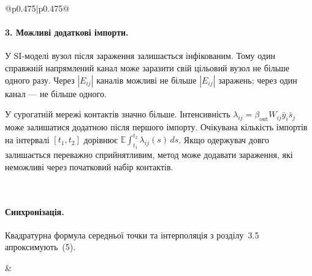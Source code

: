 \documentclass[11pt]{article}
\newcommand{\ibar}{\bar{y}}
\newcommand{\sbar}{\bar{s}}
\begin{document}
\begin{longtable}{@{}p{0.475\textwidth}|p{0.475\textwidth}@{}}
\begin{minipage}[t]{\linewidth}
\paragraph{3. Можливі додаткові імпорти.}
У SI-моделі вузол після зараження залишається інфікованим. Тому один справжній напрямлений канал може заразити свій цільовий вузол не більше одного разу. Через $|E_{ij}|$ каналів можливі не більше $|E_{ij}|$ заражень; через один канал --- не більше одного.
\par У сурогатній мережі контактів значно більше. Інтенсивність $\lambda_{ij}=\beta_{\mathrm{out}}W_{ij}\ibar_i\sbar_j$ може залишатися додатною після першого імпорту. Очікувана кількість імпортів на інтервалі $[t_1,t_2]$ дорівнює $\mathbb{E}\int_{t_1}^{t_2}\lambda_{ij}(s)\,ds$. Якщо одержувач довго залишається переважно сприйнятливим, метод може додавати зараження, які неможливі через початковий набір контактів.
\end{minipage} \\[5mm]
\begin{minipage}[t]{\linewidth}
\paragraph{Синхронізація.}
Квадратурна формула середньої точки та інтерполяція з розділу~3.5 апроксимують~(5).
\end{minipage} &
\begin{minipage}[t]{\linewidth}

\end{minipage}
\end{longtable}
\end{document}
